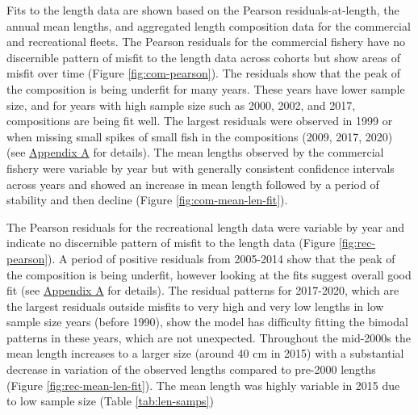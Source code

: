 \documentclass[11pt,
  english,
  a4paper,
]{article}
\begin{document}
Fits to the length data are shown based on the Pearson residuals-at-length, the annual mean lengths, and aggregated length composition data for the commercial and recreational fleets. The Pearson residuals for the commercial fishery have no discernible pattern of misfit to the length data across cohorts but show areas of misfit over time (Figure \ref{fig:com-pearson}). The residuals show that the peak of the composition is being underfit for many years. These years have lower sample size, and for years with high sample size such as 2000, 2002, and 2017, compositions are being fit well. The largest residuals were observed in 1999 or when missing small spikes of small fish in the compositions (2009, 2017, 2020) (see {\protect\hyperlink{append_a}{Appendix A}\leavevmode\tagmcend\tagstructend} for details). The mean lengths observed by the commercial fishery were variable by year but with generally consistent confidence intervals across years and showed an increase in mean length followed by a period of stability and then decline (Figure \ref{fig:com-mean-len-fit}).

\leavevmode\tagmcend\tagstructend\par


The Pearson residuals for the recreational length data were variable by year and indicate no discernible pattern of misfit to the length data (Figure \ref{fig:rec-pearson}). A period of positive residuals from 2005-2014 show that the peak of the composition is being underfit, however looking at the fits suggest overall good fit (see {\protect\hyperlink{append_a}{Appendix A}\leavevmode\tagmcend\tagstructend} for details). The residual patterns for 2017-2020, which are the largest residuals outside misfits to very high and very low lengths in low sample size years (before 1990), show the model has difficulty fitting the bimodal patterns in these years, which are not unexpected. Throughout the mid-2000s the mean length increases to a larger size (around 40 cm in 2015) with a substantial decrease in variation of the observed lengths compared to pre-2000 lengths (Figure \ref{fig:rec-mean-len-fit}). The mean length was highly variable in 2015 due to low sample size (Table \ref{tab:len-samps})

\leavevmode\tagmcend\tagstructend\par

\end{document}
